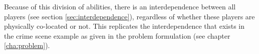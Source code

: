 	Because of this division of abilities, there is an interdependence 
	between all players (see section \ref{sec:interdependence}), regardless of
	whether these players are physically co-located or not. This replicates the 
	interdependence that exists in the crime scene example as given in the 
	problem formulation (see chapter \ref{cha:problem}).
